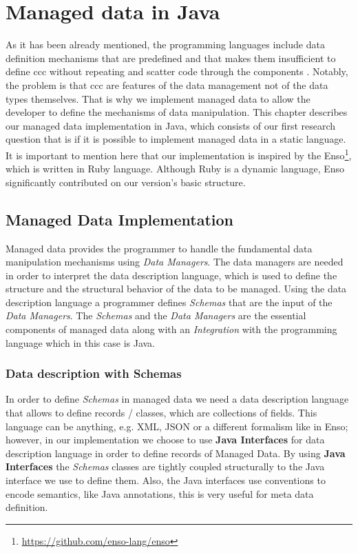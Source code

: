 
\chapter{Managed data in Java}\label{Implementation}

As it has been already mentioned, the programming languages include data definition mechanisms that are predefined and that makes them insufficient to define \ac{ccc} without repeating and scatter code through the components \cite{loh2012managed}.
Notably, the problem is that \ac{ccc} are features of the data management not of the data types themselves.
That is why we implement managed data to allow the developer to define the mechanisms of data manipulation.
This chapter describes our managed data implementation in Java, which consists of our first research question that is if it is possible to implement managed data in a static language.
It is important to mention here that our implementation is inspired by the Enso\footnote{\url{https://github.com/enso-lang/enso}}, which is written in Ruby language. 
Although Ruby is a dynamic language, Enso significantly contributed on our version's basic structure.

\section{Managed Data Implementation}\label{sec:Managed Data Implementation}
Managed data provides the programmer to handle the fundamental data manipulation mechanisms using \textit{Data Managers}.
The data managers are needed in order to interpret the data description language, which is used to define the structure and the structural behavior of the data to be managed.
Using the data description language a programmer defines \textit{Schemas} that are the input of the \textit{Data Managers}.
The \textit{Schemas} and the \textit{Data Managers} are the essential components of managed data along with an \textit{Integration} with the programming language which in this case is Java.

\subsection{Data description with Schemas}\label{Schema Definition}
In order to define \textit{Schemas} in managed data we need a data description language that allows to define records / classes, which are collections of fields. 
This language can be anything, e.g. XML, JSON or a different formalism like in Enso; however, in our implementation we choose to use \textbf{Java Interfaces} for data description language in order to define records of Managed Data.
By using \textbf{Java Interfaces} the \textit{Schemas} classes are tightly coupled structurally to the Java interface we use to define them. 
Also, the Java interfaces use conventions to encode semantics, 
like Java annotations, this is very useful for meta data definition.

